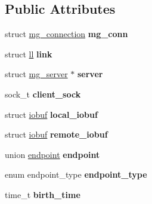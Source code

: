 \subsection*{Public Attributes}
\begin{DoxyCompactItemize}
\item 
struct \hyperlink{structmg__connection}{mg\+\_\+connection} {\bfseries mg\+\_\+conn}\hypertarget{structconnection_acba5c9648d0ccaf436d9f3b1ca4e3663}{}\label{structconnection_acba5c9648d0ccaf436d9f3b1ca4e3663}

\item 
struct \hyperlink{structll}{ll} {\bfseries link}\hypertarget{structconnection_aec1ae0ad6de0df9c890122b0eb5b2eaf}{}\label{structconnection_aec1ae0ad6de0df9c890122b0eb5b2eaf}

\item 
struct \hyperlink{structmg__server}{mg\+\_\+server} $\ast$ {\bfseries server}\hypertarget{structconnection_a409f5c2e29f77b3be3fae4f06bc4f1f1}{}\label{structconnection_a409f5c2e29f77b3be3fae4f06bc4f1f1}

\item 
sock\+\_\+t {\bfseries client\+\_\+sock}\hypertarget{structconnection_aa2095848d634ff1a4a58835f6085e3bf}{}\label{structconnection_aa2095848d634ff1a4a58835f6085e3bf}

\item 
struct \hyperlink{structiobuf}{iobuf} {\bfseries local\+\_\+iobuf}\hypertarget{structconnection_a6333727e32e2006594bd1b6decf62240}{}\label{structconnection_a6333727e32e2006594bd1b6decf62240}

\item 
struct \hyperlink{structiobuf}{iobuf} {\bfseries remote\+\_\+iobuf}\hypertarget{structconnection_a285a741f67e090a6c5e5b2dd87e58882}{}\label{structconnection_a285a741f67e090a6c5e5b2dd87e58882}

\item 
union \hyperlink{unionendpoint}{endpoint} {\bfseries endpoint}\hypertarget{structconnection_a61a295c4a3d7f32d0892c8d5b168b761}{}\label{structconnection_a61a295c4a3d7f32d0892c8d5b168b761}

\item 
enum endpoint\+\_\+type {\bfseries endpoint\+\_\+type}\hypertarget{structconnection_ad5ceb60df6470084af97e10a2a07e9ba}{}\label{structconnection_ad5ceb60df6470084af97e10a2a07e9ba}

\item 
time\+\_\+t {\bfseries birth\+\_\+time}\hypertarget{structconnection_a0e034501d49278f22ada86a3036cbbe2}{}\label{structconnection_a0e034501d49278f22ada86a3036cbbe2}


\end{DoxyCompactItemize}
